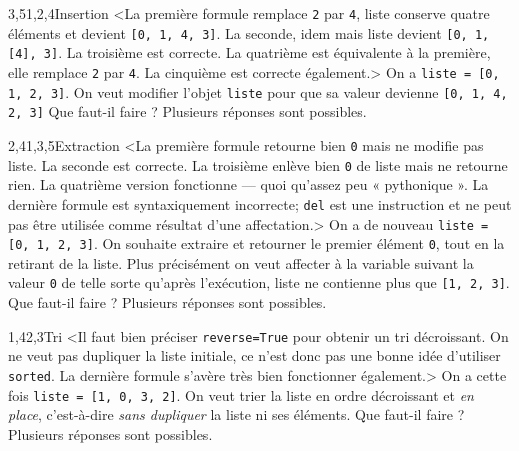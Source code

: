 \begin{quiz}[title={Listes}]
\begin{quizquestion}[b]{3,5}{1,2,4}{Insertion}
<La première formule remplace \texttt{2} par \texttt{4}, liste conserve quatre éléments et devient \texttt{[0, 1, 4, 3]}.
La seconde, idem mais liste devient \texttt{[0, 1, [4], 3]}.
La troisième est correcte.
La quatrième est équivalente à la première, elle remplace \texttt{2} par \texttt{4}.
La cinquième est correcte également.> 
On a \texttt{liste = [0, 1, 2, 3]}. On veut modifier l'objet \texttt{liste} pour que sa valeur devienne \texttt{[0, 1, 4, 2, 3]}
Que faut-il faire ? Plusieurs réponses sont possibles.
\end{quizquestion}

\begin{quizquestion}[b]{2,4}{1,3,5}{Extraction}
<La première formule retourne bien \texttt{0} mais ne modifie pas liste. La seconde est correcte. La troisième enlève bien \texttt{0} de liste mais ne retourne rien. La quatrième version fonctionne --- quoi qu'assez peu « pythonique ». La dernière formule est syntaxiquement incorrecte; \texttt{del} est une instruction et ne peut pas être utilisée comme résultat d'une affectation.> 
On a de nouveau \texttt{liste = [0, 1, 2, 3]}. On souhaite extraire et retourner le premier élément \texttt{0}, tout en la retirant de la liste. Plus précisément on veut affecter à la variable suivant la valeur \texttt{0} de telle sorte qu'après l'exécution, liste ne contienne plus que \texttt{[1, 2, 3]}.
Que faut-il faire ? Plusieurs réponses sont possibles.
\end{quizquestion}

\begin{quizquestion}[b]{1,4}{2,3}{Tri}
<Il faut bien préciser \texttt{reverse=True} pour obtenir un tri décroissant. On ne veut pas dupliquer la liste initiale, ce n'est donc pas une bonne idée d'utiliser \texttt{sorted}. La dernière formule s'avère très bien fonctionner également.> 
On a cette fois \texttt{liste = [1, 0, 3, 2]}. On veut trier la liste en ordre décroissant et \emph{en place}, c'est-à-dire \emph{sans dupliquer} la liste ni ses éléments. Que faut-il faire ? Plusieurs réponses sont possibles.
\end{quizquestion}
\end{quiz}

